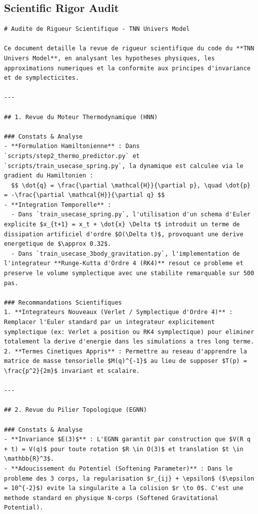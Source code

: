 \documentclass[11pt,a4paper]{article}
\begin{document}
\subsection{Scientific Rigor Audit}
\begin{lstlisting}[language={}, caption={}, basicstyle=\ttfamily\footnotesize, breaklines=true]
# Audite de Rigueur Scientifique - TNN Univers Model

Ce document detaille la revue de rigueur scientifique du code du **TNN Univers Model**, en analysant les hypotheses physiques, les approximations numeriques et la conformite aux principes d'invariance et de symplecticites.

---

## 1. Revue du Moteur Thermodynamique (HNN)

### Constats & Analyse
- **Formulation Hamiltonienne** : Dans `scripts/step2_thermo_predictor.py` et `scripts/train_usecase_spring.py`, la dynamique est calculee via le gradient du Hamiltonien :
  $$ \dot{q} = \frac{\partial \mathcal{H}}{\partial p}, \quad \dot{p} = -\frac{\partial \mathcal{H}}{\partial q} $$
- **Integration Temporelle** : 
  - Dans `train_usecase_spring.py`, l'utilisation d'un schema d'Euler explicite $x_{t+1} = x_t + \dot{x} \Delta t$ introduit un terme de dissipation artificiel d'ordre $O(\Delta t)$, provoquant une derive energetique de $\approx 0.32$.
  - Dans `train_usecase_3body_gravitation.py`, l'implementation de l'integrateur **Runge-Kutta d'Ordre 4 (RK4)** resout ce probleme et preserve le volume symplectique avec une stabilite remarquable sur 500 pas.

### Recommandations Scientifiques
1. **Integrateurs Nouveaux (Verlet / Symplectique d'Ordre 4)** : Remplacer l'Euler standard par un integrateur explicitement symplectique (ex: Verlet a position ou RK4 symplectique) pour eliminer totalement la derive d'energie dans les simulations a tres long terme.
2. **Termes Cinetiques Appris** : Permettre au reseau d'apprendre la matrice de masse tensorielle $M(q)^{-1}$ au lieu de supposer $T(p) = \frac{p^2}{2m}$ invariant et scalaire.

---

## 2. Revue du Pilier Topologique (EGNN)

### Constats & Analyse
- **Invariance $E(3)$** : L'EGNN garantit par construction que $V(R q + t) = V(q)$ pour toute rotation $R \in O(3)$ et translation $t \in \mathbb{R}^3$.
- **Adoucissement du Potentiel (Softening Parameter)** : Dans le probleme des 3 corps, la regularisation $r_{ij} + \epsilon$ ($\epsilon = 10^{-2}$) evite la singularite a la colision $r \to 0$. C'est une methode standard en physique N-corps (Softened Gravitational Potential).


\end{lstlisting}
\end{document}
